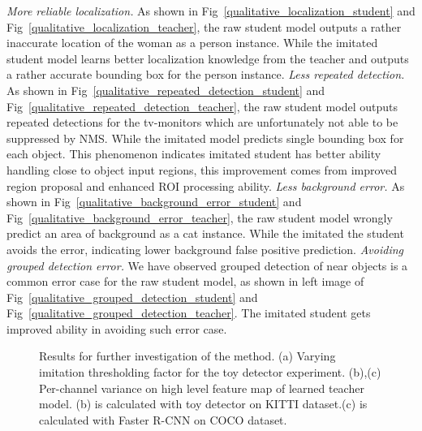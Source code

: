\documentclass[10pt,twocolumn,letterpaper]{article}
\begin{document}
\emph{More reliable localization.} As shown in Fig~\ref{qualitative_localization_student} and Fig~\ref{qualitative_localization_teacher}, the raw student model outputs a rather inaccurate location of the woman as a person instance. While the imitated student model learns better localization knowledge from the teacher and outputs a rather accurate bounding box for the person instance.
\emph{Less repeated detection.} As shown in Fig~\ref{qualitative_repeated_detection_student} and Fig~\ref{qualitative_repeated_detection_teacher}, the raw student model outputs repeated detections for the tv-monitors which are unfortunately not able to be suppressed by NMS. While the imitated model predicts single bounding box for each object. This phenomenon indicates imitated student has better ability handling close to object input regions, this improvement comes from improved region proposal and enhanced ROI processing ability.
\emph{Less background error.} As shown in Fig~\ref{qualitative_background_error_student} and Fig~\ref{qualitative_background_error_teacher}, the raw student model wrongly predict an area of background as a cat instance. While the imitated the student avoids the error, indicating lower background false positive prediction.
\emph{Avoiding grouped detection error.} We have observed grouped detection of near objects is a common error case for the raw student model, as shown in left image of Fig~\ref{qualitative_grouped_detection_student} and Fig~\ref{qualitative_grouped_detection_teacher}. The imitated student gets improved ability in avoiding such error case.


			\begin{figure*}[!t]
				\centering
				\caption{Results for further investigation of the method. (a) Varying imitation thresholding factor  for the toy detector experiment. (b),(c) Per-channel variance on high level feature map of learned teacher model. (b) is calculated with toy detector on KITTI dataset.(c) is calculated with Faster R-CNN on COCO dataset.}
				\label{fig_further_investigation} 
				\vspace{-4mm}
			\end{figure*}		
\end{document}
